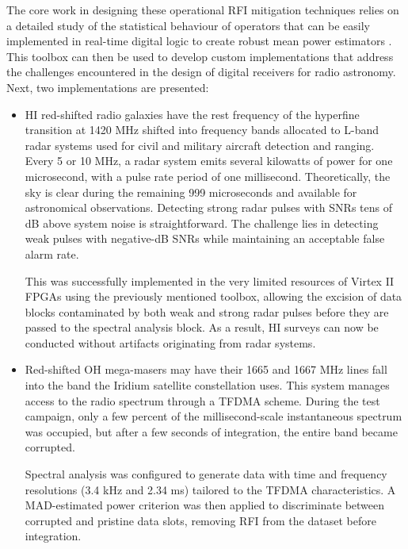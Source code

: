 \begin{itemize}
The core work in designing these operational RFI mitigation techniques relies on a detailed study of the statistical behaviour of operators that can be easily implemented in real-time digital logic to create robust mean power estimators \cite{dumezviou:tel-00319939}. This toolbox can then be used to develop custom implementations that address the challenges encountered in the design of digital receivers for radio astronomy.  Next, two implementations are presented:

\begin{itemize}
\item HI red-shifted radio galaxies have the rest frequency of the hyperfine transition at 1420 MHz shifted into frequency bands allocated to L-band radar systems used for civil and military aircraft detection and ranging. Every 5 or 10 MHz, a radar system emits several kilowatts of power for one microsecond, with a pulse rate period of one millisecond. Theoretically, the sky is clear during the remaining 999 microseconds and available for astronomical observations. Detecting strong radar pulses with SNRs tens of dB above system noise is straightforward. The challenge lies in detecting weak pulses with negative-dB SNRs while maintaining an acceptable false alarm rate.

This was successfully implemented in the very limited resources of Virtex II FPGAs using the previously mentioned toolbox, allowing the excision of data blocks contaminated by both weak and strong radar pulses before they are passed to the spectral analysis block. As a result, HI surveys can now be conducted without artifacts originating from radar systems.


\item Red-shifted OH mega-masers may have their 1665 and 1667 MHz lines fall into the band the Iridium satellite constellation uses. This system manages access to the radio spectrum through a TFDMA scheme. During the test campaign, only a few percent of the millisecond-scale instantaneous spectrum was occupied, but after a few seconds of integration, the entire band became corrupted.

Spectral analysis was configured to generate data with time and frequency resolutions (3.4 kHz and 2.34 ms) tailored to the TFDMA characteristics. A MAD-estimated power criterion was then applied to discriminate between corrupted and pristine data slots, removing RFI from the dataset before integration.


\end{itemize}
\end{itemize}
